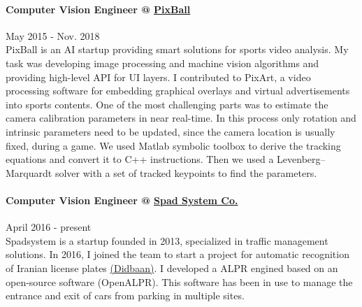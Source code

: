 \documentclass[10pt]{res}
\begin{document}
\begin{resume}
\paragraph{Computer Vision Engineer @ \href{http://pixballsports.com}{PixBall}}  \hfill May 2015 - Nov. 2018\\
PixBall is an AI startup providing smart solutions for sports video analysis. My task was developing image processing and machine vision algorithms and providing high-level API for UI layers. I contributed to PixArt, a video processing software for embedding graphical overlays and virtual advertisements into sports contents. One of the most challenging parts was to estimate the camera calibration parameters in near real-time. In this process only rotation and intrinsic parameters need to be updated, since the camera location is usually fixed, during a game. We used Matlab symbolic toolbox to derive the tracking equations and convert it to C++ instructions. Then we used a Levenberg–Marquardt solver with a set of tracked keypoints to find the parameters.

\paragraph{Computer Vision Engineer @ \href{http://www.spadsystem.com/}{Spad System Co.} } \hfill April 2016 - present\\
Spadsystem is a startup founded in 2013, specialized in traffic management solutions. In 2016, I joined the team to start a project for automatic recognition of Iranian license plates \href{http://didbaan.com}{(Didbaan)}. I developed a ALPR engined based on an open-source software (OpenALPR). This software has been in use to manage the entrance and exit of cars from parking in multiple sites.


\end{resume}
\end{document}
